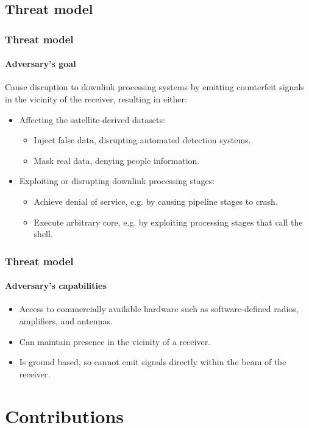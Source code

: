 \documentclass{beamer}
\begin{document}
\subsection{Threat model}
\begin{frame}
  \frametitle{Threat model}
  \framesubtitle{Adversary's goal}
  Cause disruption to downlink processing systems by emitting counterfeit signals in the vicinity of the receiver, resulting in either:
  \newline

  \begin{itemize}
    \item Affecting the satellite-derived datasets:
    \begin{itemize}
      \item Inject false data, disrupting automated detection systems.
      \item Mask real data, denying people information.
    \end{itemize}
    \item Exploiting or disrupting downlink processing stages:
    \begin{itemize}
      \item Achieve denial of service, e.g. by causing pipeline stages to crash.
      \item Execute arbitrary core, e.g. by exploiting processing stages that call the shell.
    \end{itemize}
  \end{itemize}
\end{frame}

\begin{frame}
  \frametitle{Threat model}
  \framesubtitle{Adversary's capabilities}
  \begin{itemize}
    \item Access to commercially available hardware such as software-defined radios, amplifiers, and antennas.
    \item Can maintain presence in the vicinity of a receiver.
    \item Is ground based, so cannot emit signals directly within the beam of the receiver.
  \end{itemize}
\end{frame}

\section{Contributions}
\end{document}
